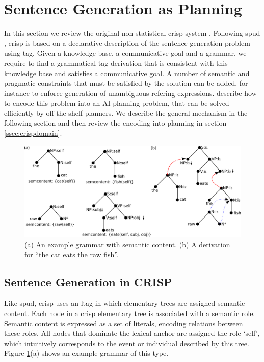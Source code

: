 \section{Sentence Generation as Planning}
\label{sec:crisp}
In this section we review the original non-statistical {\sc crisp} system \cite{kollerstone2007}. 
Following {\sc spud} \cite{stonedoran1997}, {\sc crisp} is based on a declarative description of the sentence generation problem using {\sc tag}. Given a knowledge base, a communicative goal and a grammar, we require to find a grammatical {\sc tag} derivation that is consistent with this knowledge base and satisfies a communicative goal. A number of semantic and pragmatic constraints that must be satisfied by the solution can be added, for instance to enforce generation of unambiguous refering expressions.  describe how to encode this problem into an AI planning problem, that can be solved efficiently by off-the-shelf planners. We describe the general mechanism in the following section and then review the encoding into planning in section \ref{ssec:crispdomain}. 
\begin{figure}[th]
\begin{center}
\includegraphics[width=.8\textwidth]{figures/grammar.pdf}
\caption{\label{fig:grammar}(a) An example grammar with semantic content. (b) A derivation for ``the cat eats the raw fish''. }
\end{center}
\end{figure}

\subsection{Sentence Generation in CRISP}
Like {\sc spud}, {\sc crisp} uses an {\sc ltag} in which elementary trees are assigned semantic content. Each node in a {\sc crisp} elementary tree is associated with a semantic role. Semantic content is expressed as a set of literals, encoding relations between these roles. All nodes that dominate the lexical anchor are assigned the role `self', which intuitively corresponds to the event or individual described by this tree. Figure \ref{fig:grammar}(a) shows an example grammar of this type. 

